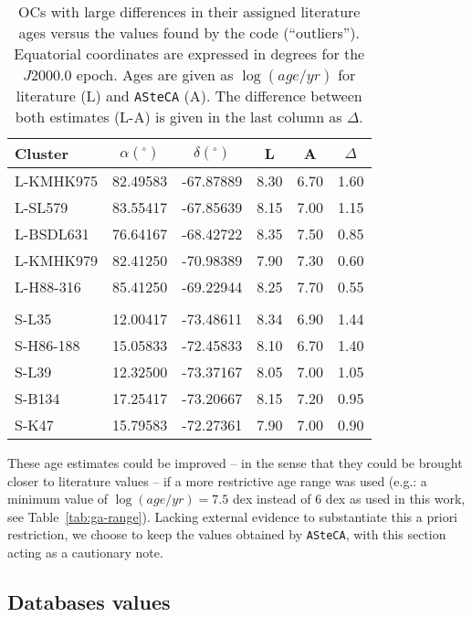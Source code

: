 \documentclass{aa}
\begin{document}
\begin{table}
\centering
\caption{OCs with large differences in their assigned literature ages versus
the values found by the code (``outliers'').
Equatorial coordinates are expressed in degrees for the $J2000.0$ epoch.
Ages are given as $\log(age/yr)$ for literature (L) and \texttt{ASteCA} (A).
The difference between both estimates (L-A) is given in the last column as
$\Delta$.}
\label{tab:outliers}
\begin{tabular}{lccccc}
\hline\hline
Cluster & $\alpha(^\circ)$ & $\delta(^\circ)$ & L & A & $\Delta$\\
\hline
L-KMHK975 & 82.49583 & -67.87889 & 8.30 & 6.70 & 1.60\\
L-SL579 & 83.55417 & -67.85639 & 8.15 & 7.00 & 1.15\\
L-BSDL631 & 76.64167 & -68.42722 & 8.35 & 7.50 & 0.85\\
L-KMHK979 & 82.41250 & -70.98389 & 7.90 & 7.30 & 0.60\\
L-H88-316 & 85.41250 & -69.22944 & 8.25 & 7.70 & 0.55\\
\\[-1.85ex]
S-L35 & 12.00417 & -73.48611 & 8.34 & 6.90 & 1.44\\
S-H86-188 & 15.05833 & -72.45833 & 8.10 & 6.70 & 1.40\\
S-L39 & 12.32500 & -73.37167 & 8.05 & 7.00 & 1.05\\
S-B134 & 17.25417 & -73.20667 & 8.15 & 7.20 & 0.95\\
S-K47 & 15.79583 & -72.27361 & 7.90 & 7.00 & 0.90\\
\hline
\end{tabular}
\end{table}


These age estimates could be improved -- in the sense that they could
be brought closer to literature values -- if a more restrictive age range was
used (e.g.: a minimum value of $\log(age/yr){=}7.5$ dex instead of 6 dex as used
in this work, see Table~\ref{tab:ga-range}).
Lacking external evidence to substantiate this a priori restriction, we choose
to keep the values obtained by \texttt{ASteCA}, with this section acting as a
cautionary note.



\subsection{Databases values}
\label{ssec:db-values}
\end{document}
